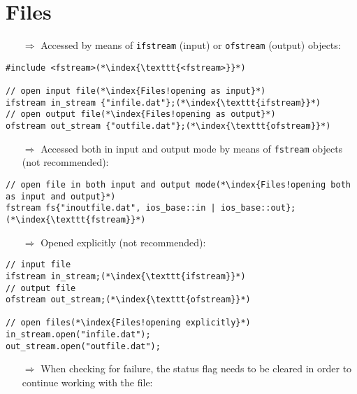 \documentclass[10pt]{book}
\begin{document}
\section{Files}
\begin{enumerate}
\item[$\Rightarrow$] Accessed by means of \texttt{ifstream} (input) or \texttt{ofstream} (output) objects:
\end{enumerate}
\begin{lstlisting}
#include <fstream>(*\index{\texttt{<fstream>}}*)

// open input file(*\index{Files!opening as input}*)
ifstream in_stream {"infile.dat"};(*\index{\texttt{ifstream}}*)
// open output file(*\index{Files!opening as output}*)
ofstream out_stream {"outfile.dat"};(*\index{\texttt{ofstream}}*)
\end{lstlisting}
\begin{enumerate}
\item[$\Rightarrow$] Accessed both in input and output mode by means of \texttt{fstream} objects (not recommended):
\end{enumerate}
\begin{lstlisting}
// open file in both input and output mode(*\index{Files!opening both as input and output}*)
fstream fs{"inoutfile.dat", ios_base::in | ios_base::out};(*\index{\texttt{fstream}}*)
\end{lstlisting}
\begin{enumerate}
\item[$\Rightarrow$] Opened explicitly (not recommended):
\end{enumerate}
\begin{lstlisting}
// input file 
ifstream in_stream;(*\index{\texttt{ifstream}}*)
// output file
ofstream out_stream;(*\index{\texttt{ofstream}}*)

// open files(*\index{Files!opening explicitly}*)
in_stream.open("infile.dat");
out_stream.open("outfile.dat");
\end{lstlisting}
\begin{enumerate}
\item[$\Rightarrow$] When checking for failure, the status flag needs to be cleared in order to continue working with the file:
\end{enumerate}
\end{document}
